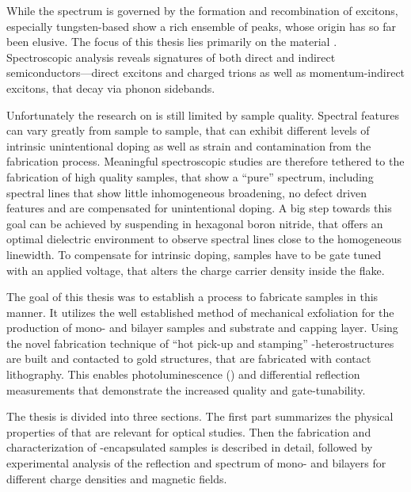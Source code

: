 While the spectrum is governed by the formation and recombination of excitons, especially tungsten-based \tmds show a rich ensemble of peaks, whose origin has so far been elusive. The focus of this thesis lies primarily on the material \wse\!. Spectroscopic analysis reveals signatures of both direct and indirect semiconductors---direct excitons and charged trions as well as momentum-indirect excitons, that decay via phonon sidebands.

Unfortunately the research on \tmds is still limited by sample quality. Spectral features can vary greatly from sample to sample, that can exhibit different levels of intrinsic unintentional doping as well as strain and contamination from the fabrication process. Meaningful spectroscopic studies are therefore tethered to the fabrication of high quality samples, that show a ``pure'' spectrum, including spectral lines that show little inhomogeneous broadening, no defect driven features and are compensated for unintentional doping. A big step towards this goal can be achieved by suspending \tmds in hexagonal boron nitride, that offers an optimal dielectric environment to observe spectral lines close to the homogeneous linewidth\cite{dean_boron_2010,cadiz_excitonic_2017}. To compensate for intrinsic doping, samples have to be gate tuned with an applied voltage, that alters the charge carrier density inside the flake.

The goal of this thesis was to establish a process to fabricate samples in this manner. It utilizes the well established method of mechanical exfoliation for the production of \tmdg mono- and bilayer samples and \hbng substrate and capping layer. Using the novel fabrication technique of ``hot pick-up and stamping'' \hbn-\tmdg heterostructures are built and contacted to gold structures, that are fabricated with contact lithography. This enables photoluminescence (\pl) and differential reflection measurements that demonstrate the increased quality and gate-tunability.

The thesis is divided into three sections. The first part summarizes the physical properties of \tmds that are relevant for optical studies. Then the fabrication and characterization of \hbn-encapsulated samples is described in detail, followed by experimental analysis of the reflection and \pl spectrum of \wse mono- and bilayers for different charge densities and magnetic fields.




